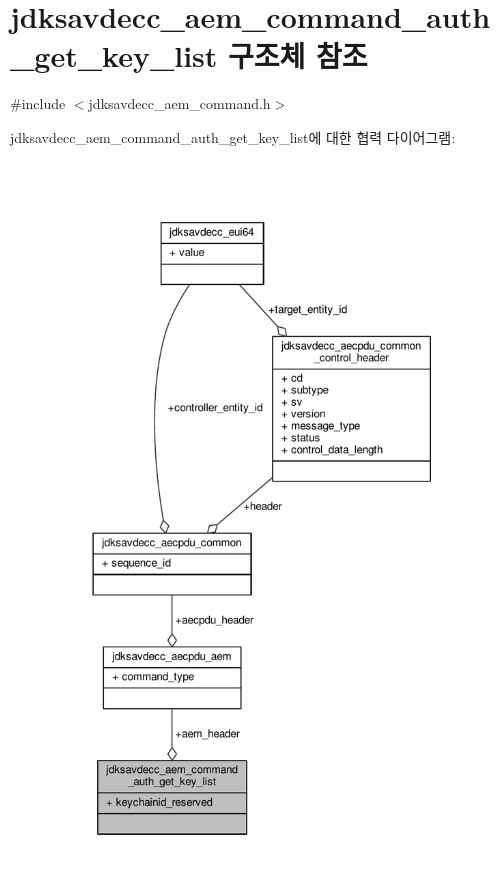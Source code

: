 \hypertarget{structjdksavdecc__aem__command__auth__get__key__list}{}\section{jdksavdecc\+\_\+aem\+\_\+command\+\_\+auth\+\_\+get\+\_\+key\+\_\+list 구조체 참조}
\label{structjdksavdecc__aem__command__auth__get__key__list}


{\ttfamily \#include $<$jdksavdecc\+\_\+aem\+\_\+command.\+h$>$}



jdksavdecc\+\_\+aem\+\_\+command\+\_\+auth\+\_\+get\+\_\+key\+\_\+list에 대한 협력 다이어그램\+:
\nopagebreak
\begin{figure}[H]
\begin{center}
\leavevmode
\includegraphics[height=550pt]{structjdksavdecc__aem__command__auth__get__key__list__coll__graph}
\end{center}
\end{figure}

